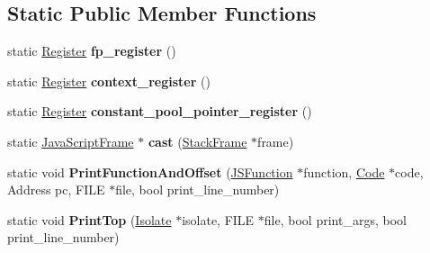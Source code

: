 \subsection*{Static Public Member Functions}
\begin{DoxyCompactItemize}
\item 
static \hyperlink{structv8_1_1internal_1_1_register}{Register} {\bfseries fp\+\_\+register} ()\hypertarget{classv8_1_1internal_1_1_java_script_frame_aeac2817ca9aa85228525437bb63ba93a}{}\label{classv8_1_1internal_1_1_java_script_frame_aeac2817ca9aa85228525437bb63ba93a}

\item 
static \hyperlink{structv8_1_1internal_1_1_register}{Register} {\bfseries context\+\_\+register} ()\hypertarget{classv8_1_1internal_1_1_java_script_frame_a9e00a6dd7a2c9facca672c58dbc71df6}{}\label{classv8_1_1internal_1_1_java_script_frame_a9e00a6dd7a2c9facca672c58dbc71df6}

\item 
static \hyperlink{structv8_1_1internal_1_1_register}{Register} {\bfseries constant\+\_\+pool\+\_\+pointer\+\_\+register} ()\hypertarget{classv8_1_1internal_1_1_java_script_frame_af5bce3abfebd253e22d34c5f2e6a14ff}{}\label{classv8_1_1internal_1_1_java_script_frame_af5bce3abfebd253e22d34c5f2e6a14ff}

\item 
static \hyperlink{classv8_1_1internal_1_1_java_script_frame}{Java\+Script\+Frame} $\ast$ {\bfseries cast} (\hyperlink{classv8_1_1_stack_frame}{Stack\+Frame} $\ast$frame)\hypertarget{classv8_1_1internal_1_1_java_script_frame_ac66e5118c1b57fd1508b201694cd7d54}{}\label{classv8_1_1internal_1_1_java_script_frame_ac66e5118c1b57fd1508b201694cd7d54}

\item 
static void {\bfseries Print\+Function\+And\+Offset} (\hyperlink{classv8_1_1internal_1_1_j_s_function}{J\+S\+Function} $\ast$function, \hyperlink{classv8_1_1internal_1_1_code}{Code} $\ast$code, Address pc, F\+I\+LE $\ast$file, bool print\+\_\+line\+\_\+number)\hypertarget{classv8_1_1internal_1_1_java_script_frame_ad44849ad3b95b89853394db76c32734d}{}\label{classv8_1_1internal_1_1_java_script_frame_ad44849ad3b95b89853394db76c32734d}

\item 
static void {\bfseries Print\+Top} (\hyperlink{classv8_1_1internal_1_1_isolate}{Isolate} $\ast$isolate, F\+I\+LE $\ast$file, bool print\+\_\+args, bool print\+\_\+line\+\_\+number)\hypertarget{classv8_1_1internal_1_1_java_script_frame_a69de8494527b217bfd2bcde82196cd31}{}\label{classv8_1_1internal_1_1_java_script_frame_a69de8494527b217bfd2bcde82196cd31}

\end{DoxyCompactItemize}
